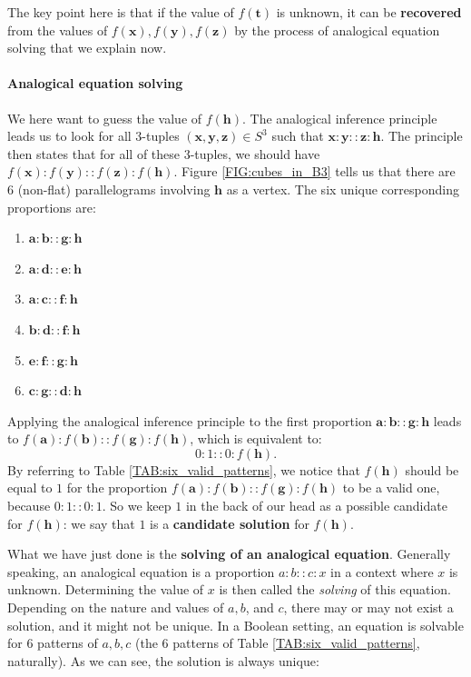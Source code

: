 The key point here is that if the value of $f(\mathbf{t})$ is unknown, it can
be \textbf{recovered} from the values of $f(\mathbf{x}), f(\mathbf{y}),
f(\mathbf{z})$ by the process of analogical equation solving that we explain
now.

\paragraph{Analogical equation solving\\}

We here want to guess the
value of $f(\mathbf{h})$. The analogical inference principle leads us to look
for all 3-tuples $(\mathbf{x}, \mathbf{y}, \mathbf{z}) \in S^3$ such that
$\mathbf{x}:\mathbf{y}::\mathbf{z}:\mathbf{h}$.  The principle then states that
for all of these $3$-tuples, we should have
$f(\mathbf{x}):f(\mathbf{y})::f(\mathbf{z}):f(\mathbf{h})$.
Figure \ref{FIG:cubes_in_B3} tells us that there are 6 (non-flat)
parallelograms involving $\mathbf{h}$ as a vertex. The six unique corresponding
proportions are:

\begin{enumerate}
  \item $\mathbf{a} : \mathbf{b} :: \mathbf{g} : \mathbf{h}$
  \item $\mathbf{a} : \mathbf{d} :: \mathbf{e} : \mathbf{h}$
  \item $\mathbf{a} : \mathbf{c} :: \mathbf{f} : \mathbf{h}$
  \item $\mathbf{b} : \mathbf{d} :: \mathbf{f} : \mathbf{h}$
  \item $\mathbf{e} : \mathbf{f} :: \mathbf{g} : \mathbf{h}$
  \item $\mathbf{c} : \mathbf{g} :: \mathbf{d} : \mathbf{h}$
\end{enumerate}

Applying the analogical inference principle to the first proportion $\mathbf{a}
: \mathbf{b} :: \mathbf{g} : \mathbf{h}$ leads to $f(\mathbf{a}) :
f(\mathbf{b}) :: f(\mathbf{g}) : f(\mathbf{h})$, which is equivalent to:
$$0:1::0:f(\mathbf{h}).$$ By referring to Table \ref{TAB:six_valid_patterns}, we
notice that $f(\mathbf{h})$ should be equal to $1$ for the proportion
$f(\mathbf{a}) : f(\mathbf{b}) :: f(\mathbf{g}) : f(\mathbf{h})$ to be a valid
one, because $0:1::0:1$. So we keep $1$ in the back of our head as a possible
candidate for $f(\mathbf{h})$: we say that $1$ is a \textbf{candidate
solution} for $f(\mathbf{h})$.

What we have just done is the \textbf{solving of an analogical equation}.
Generally speaking, an analogical equation is a proportion $a:b::c:x$ in a
context where $x$ is unknown. Determining the value of $x$ is then called the
\textit{solving} of this equation. Depending on the nature and values of $a, b$,
and $c$, there may or may not exist a solution, and it might not be unique. In a
Boolean setting, an equation is solvable for 6 patterns of $a, b, c$ (the 6
patterns of Table \ref{TAB:six_valid_patterns}, naturally). As we can see, the
solution is always unique:

